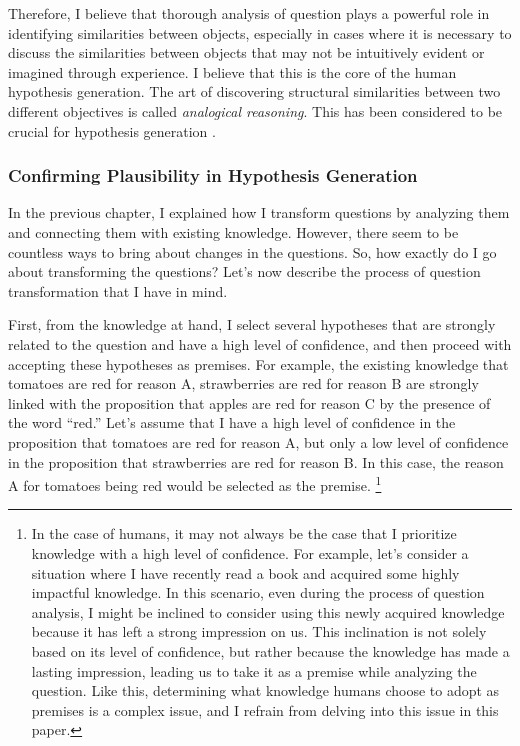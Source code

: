 Therefore, I believe that thorough analysis of question plays a powerful role in identifying similarities between objects, especially in cases where it is necessary to discuss the similarities between objects that may not be intuitively evident or imagined through experience. I believe that this is the core of the human hypothesis generation. The art of discovering structural similarities between two different objectives is called \textit{analogical reasoning}. This has been considered to be crucial for hypothesis generation \cite{hesse1965models,thagard_1984,gentner1993shift,holyoak1996mental,dunbar1997scientists,gentner2002analogy}. 

\subsubsection{Confirming Plausibility in Hypothesis Generation}

In the previous chapter, I explained how I transform questions by analyzing them and connecting them with existing knowledge. However, there seem to be countless ways to bring about changes in the questions. So, how exactly do I go about transforming the questions? Let's now describe the process of question transformation that I have in mind.


First, from the knowledge at hand, I select several hypotheses that are strongly related to the question and have a high level of confidence, and then proceed with accepting these hypotheses as premises. For example, the existing knowledge that tomatoes are red for reason A, strawberries are red for reason B  are strongly linked with the proposition that apples are red for reason C by the presence of the word ``red.'' Let's assume that I have a high level of confidence in the proposition that tomatoes are red for reason A, but only a low level of confidence in the proposition that strawberries are red for reason B. In this case, the reason A for tomatoes being red would be selected as the premise. \footnote{
In the case of humans, it may not always be the case that I prioritize knowledge with a high level of confidence. For example, let's consider a situation where I have recently read a book and acquired some highly impactful knowledge. In this scenario, even during the process of question analysis, I might be inclined to consider using this newly acquired knowledge because it has left a strong impression on us. This inclination is not solely based on its level of confidence, but rather because the knowledge has made a lasting impression, leading us to take it as a premise while analyzing the question. Like this, determining what knowledge humans choose to adopt as premises is a complex issue, and I refrain from delving into this issue in this paper.
}

